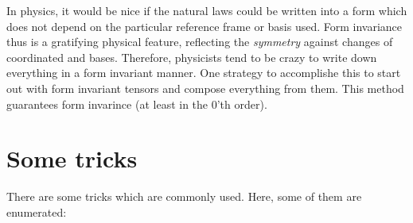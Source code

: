 In physics, it would be nice if the natural laws could be written into a
form which does not depend on the particular reference frame or  basis
used.
Form invariance thus is a gratifying physical feature, reflecting the
{\em symmetry} against changes of coordinated and bases.
Therefore, physicists tend to be crazy to write down everything in a
form invariant manner.
One strategy to accomplishe this to start out with form invariant
tensors and compose everything from them. This method guarantees form
invarince (at least in the 0'th order).

%
%


\section{Some tricks}

There are some tricks which are commonly used.
Here, some of them are enumerated:

